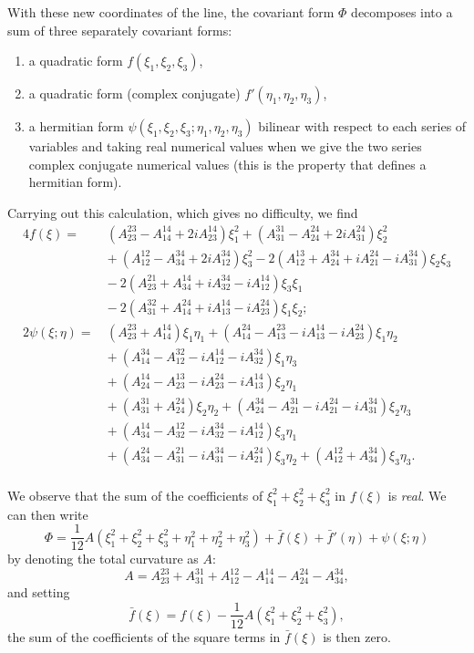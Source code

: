 \documentclass[leqno,12pt]{article}
\theoremstyle{shape1}
\theoremstyle{shape0}
\theoremstyle{shape2}
\theoremstyle{definition}
\begin{document}
With these new coordinates of the line, the covariant form $\Phi$ decomposes into a sum of three separately covariant forms:
\begin{enumerate}
\item a quadratic form $f(\xi_{1},\xi_{2},\xi_{3})$,
\item a quadratic form (complex conjugate) $f'(\eta_{1},\eta_{2},\eta_{3})$,
\item a hermitian form $\psi(\xi_{1},\xi_{2},\xi_{3};\eta_{1},\eta_{2},\eta_{3})$ bilinear with respect to each series of variables and taking real numerical values when we give the two series complex conjugate numerical values (this is the property that defines a hermitian form).
\end{enumerate}
Carrying out this calculation, which gives no difficulty, we find
\begin{align*}
  4f(\xi)=&\,{}(A^{23}_{23}-A^{14}_{14}+2iA^{14}_{23})\xi^{2}_{1}
+(A^{31}_{31}-A^{24}_{24}+2iA^{24}_{31})\xi^{2}_{2}\\
&{}+(A^{12}_{12}-A^{34}_{34}+2iA^{34}_{12})\xi^{2}_{3}
-2(A^{13}_{12}+A^{34}_{24}+iA^{24}_{21}-iA^{34}_{31})\xi_{2}\xi_{3}\\
&{}-2(A^{21}_{23}+A^{14}_{34}+iA^{34}_{32}-iA^{14}_{12})\xi_{3}\xi_{1}\\
&{}-2(A^{32}_{31}+A^{24}_{14}+iA^{14}_{13}-iA^{24}_{23})\xi_{1}\xi_{2};\\
2\psi(\xi;\eta)=&{}\,(A^{23}_{23}+A^{14}_{14})\xi_{1}\eta_{1}
+(A^{24}_{14}-A^{23}_{13}-iA^{14}_{13}-iA^{24}_{23})\xi_{1}\eta_{2}\\
&{}+(A^{34}_{14}-A^{32}_{12}-iA^{14}_{12}-iA^{34}_{32})\xi_{1}\eta_{3}\\
&{}+(A^{14}_{24}-A^{13}_{23}-iA^{24}_{23}-iA^{14}_{13})\xi_{2}\eta_{1}\\
&{}+(A^{31}_{31}+A^{24}_{24})\xi_{2}\eta_{2}
+(A^{34}_{24}-A^{31}_{21}-iA^{24}_{21}-iA^{34}_{31})\xi_{2}\eta_{3}\\
&{}+(A^{14}_{34}-A^{12}_{32}-iA^{34}_{32}-iA^{14}_{12})\xi_{3}\eta_{1}\\
&{}+(A^{24}_{34}-A^{21}_{31}-iA^{34}_{31}-iA^{24}_{21})\xi_{3}\eta_{2}+(A^{12}_{12}+A^{34}_{34})\xi_{3}\eta_{3}.\\
\end{align*}

We observe that the sum of the coefficients of $\xi_{1}^{2}+\xi_{2}^{2}+\xi_{3}^{2}$ in $f(\xi)$ is \emph{real}. We can then write
\[
\Phi=\frac{1}{12}A(\xi_{1}^{2}+\xi_{2}^{2}+\xi_{3}^{2}+\eta_{1}^{2}+\eta_{2}^{2}+\eta_{3}^{2})+\bar f(\xi)+\bar f'(\eta)+\psi(\xi;\eta)
\]
by denoting the total curvature as $A$:
\[
A=A^{23}_{23}+A^{31}_{31}+A^{12}_{12}-A^{14}_{14}-A^{24}_{24}-A^{34}_{34},
\]
and setting
\[
\bar f(\xi)=f(\xi)-\frac{1}{12}A(\xi_{1}^{2}+\xi_{2}^{2}+\xi_{3}^{2}),
\]
the sum of the coefficients of the square terms in $\bar f(\xi)$ is then zero.
\end{document}

